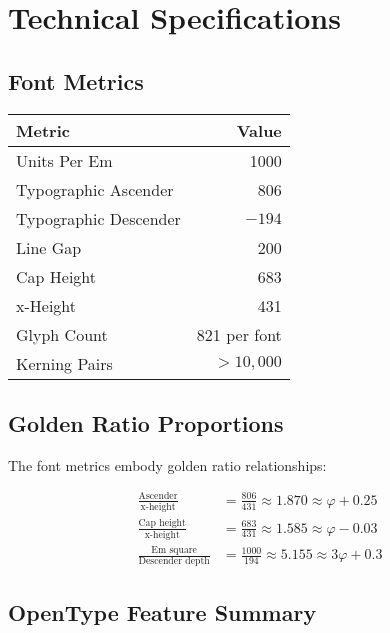 \documentclass[11pt,letterpaper]{article}
\newcommand{\goldenratio}{\varphi}
\begin{document}
\newpage


\section{Technical Specifications}

\subsection{Font Metrics}

\begin{center}
\begin{tabular}{lr}
\toprule
\textbf{Metric} & \textbf{Value} \\
\midrule
Units Per Em & 1000 \\
Typographic Ascender & 806 \\
Typographic Descender & $-194$ \\
Line Gap & 200 \\
Cap Height & 683 \\
x-Height & 431 \\
Glyph Count & 821 per font \\
Kerning Pairs & $>10{,}000$ \\
\bottomrule
\end{tabular}
\end{center}

\subsection{Golden Ratio Proportions}

The font metrics embody golden ratio relationships:

\begin{align}
\frac{\text{Ascender}}{\text{x-height}} &= \frac{806}{431} \approx 1.870 \approx \goldenratio + 0.25\\
\frac{\text{Cap height}}{\text{x-height}} &= \frac{683}{431} \approx 1.585 \approx \goldenratio - 0.03\\
\frac{\text{Em square}}{\text{Descender depth}} &= \frac{1000}{194} \approx 5.155 \approx 3\goldenratio + 0.3
\end{align}

\subsection{OpenType Feature Summary}
\end{document}
